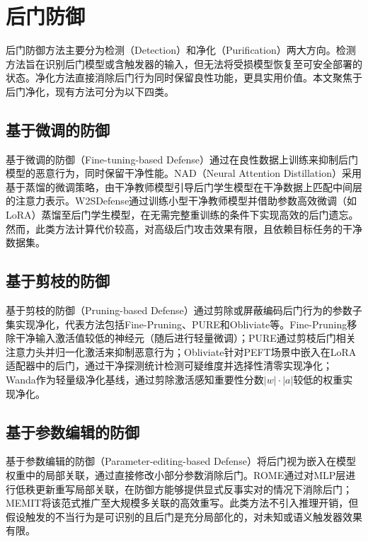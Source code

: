 \section{后门防御}

后门防御方法主要分为检测（Detection）和净化（Purification）两大方向。检测方法旨在识别后门模型或含触发器的输入，但无法将受损模型恢复至可安全部署的状态。净化方法直接消除后门行为同时保留良性功能，更具实用价值。本文聚焦于后门净化，现有方法可分为以下四类。

\subsection{基于微调的防御}

基于微调的防御（Fine-tuning-based Defense）通过在良性数据上训练来抑制后门模型的恶意行为，同时保留干净性能。NAD（Neural Attention Distillation）\cite{li2021nad}采用基于蒸馏的微调策略，由干净教师模型引导后门学生模型在干净数据上匹配中间层的注意力表示。W2SDefense\cite{yang2022w2sdefense}通过训练小型干净教师模型并借助参数高效微调（如LoRA\cite{hu2022lora}）蒸馏至后门学生模型，在无需完整重训练的条件下实现高效的后门遗忘。然而，此类方法计算代价较高，对高级后门攻击效果有限，且依赖目标任务的干净数据集。

\subsection{基于剪枝的防御}

基于剪枝的防御（Pruning-based Defense）通过剪除或屏蔽编码后门行为的参数子集实现净化，代表方法包括Fine-Pruning\cite{liu2018finepruning}、PURE\cite{zhu2024pure}和Obliviate\cite{li2024obliviate}等。Fine-Pruning移除干净输入激活值较低的神经元（随后进行轻量微调）；PURE通过剪枝后门相关注意力头并归一化激活来抑制恶意行为；Obliviate针对PEFT场景中嵌入在LoRA适配器中的后门，通过干净探测统计检测可疑维度并选择性清零实现净化；Wanda\cite{sun2023wanda}作为轻量级净化基线，通过剪除激活感知重要性分数$|w| \cdot |a|$较低的权重实现净化。

\subsection{基于参数编辑的防御}

基于参数编辑的防御（Parameter-editing-based Defense）将后门视为嵌入在模型权重中的局部关联，通过直接修改小部分参数消除后门。ROME\cite{meng2022rome}通过对MLP层进行低秩更新重写局部关联，在防御方能够提供显式反事实对的情况下消除后门；MEMIT\cite{meng2023memit}将该范式推广至大规模多关联的高效重写。此类方法不引入推理开销，但假设触发的不当行为是可识别的且后门是充分局部化的，对未知或语义触发器效果有限。


